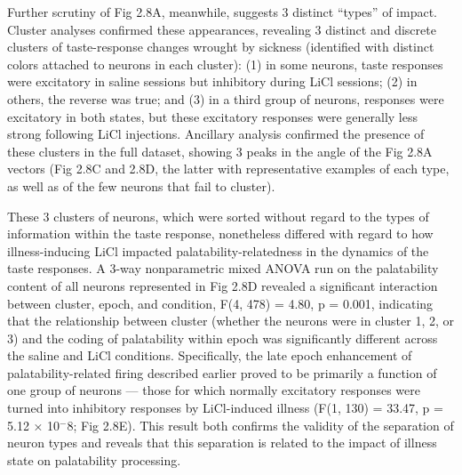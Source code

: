 \begin{refsection}
Further scrutiny of Fig 2.8A, meanwhile, suggests 3 distinct “types” of impact. Cluster analyses confirmed these appearances, revealing 3 distinct and discrete clusters of taste-response changes wrought by sickness (identified with distinct colors attached to neurons in each cluster): (1) in some neurons, taste responses were excitatory in saline sessions but inhibitory during LiCl sessions; (2) in others, the reverse was true; and (3) in a third group of neurons, responses were excitatory in both states, but these excitatory responses were generally less strong following LiCl injections. Ancillary analysis confirmed the presence of these clusters in the full dataset, showing 3 peaks in the angle of the Fig 2.8A vectors (Fig 2.8C and 2.8D, the latter with representative examples of each type, as well as of the few neurons that fail to cluster).

These 3 clusters of neurons, which were sorted without regard to the types of information within the taste response, nonetheless differed with regard to how illness-inducing LiCl impacted palatability-relatedness in the dynamics of the taste responses. A 3-way nonparametric mixed ANOVA run on the palatability content of all neurons represented in Fig 2.8D revealed a significant interaction between cluster, epoch, and condition, F(4, 478) = 4.80, p = 0.001, indicating that the relationship between cluster (whether the neurons were in cluster 1, 2, or 3) and the coding of palatability within epoch was significantly different across the saline and LiCl conditions. Specifically, the late epoch enhancement of palatability-related firing described earlier proved to be primarily a function of one group of neurons --- those for which normally excitatory responses were turned into inhibitory responses by LiCl-induced illness (F(1, 130) = 33.47, p = 5.12 × 10$^-8$; Fig 2.8E). This result both confirms the validity of the separation of neuron types and reveals that this separation is related to the impact of illness state on palatability processing.



\end{refsection}
